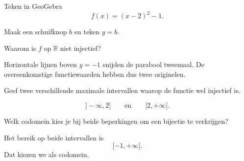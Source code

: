 \documentclass{ximera}
\begin{document}
\begin{oefening}{\oefU\ESS}

Teken in GeoGebra
\[
f(x)=(x-2)^2-1.
\]

Maak een schuifknop \(b\) en teken \(y=b\).

\begin{question}
Waarom is \(f\) op \(\mathbb R\) niet injectief?

\begin{oplossing}
Horizontale lijnen boven \(y=-1\) snijden de parabool tweemaal.
De overeenkomstige functiewaarden hebben dus twee originelen.
\end{oplossing}
\end{question}

\begin{question}
Geef twee verschillende maximale intervallen waarop de functie wel injectief is.

\begin{oplossing}
\[
]-\infty,2]
\qquad\text{en}\qquad
[2,+\infty[.
\]
\end{oplossing}
\end{question}

\begin{question}
Welk codomein kies je bij beide beperkingen om een bijectie te verkrijgen?

\begin{oplossing}
Het bereik op beide intervallen is
\[
[-1,+\infty[.
\]
Dat kiezen we als codomein.
\end{oplossing}
\end{question}

\end{oefening}
\end{document}
